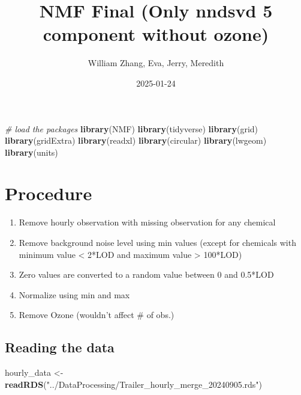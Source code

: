 \documentclass[
]{article}
\title{NMF Final (Only nndsvd 5 component without ozone)}
\author{William Zhang, Eva, Jerry, Meredith}
\date{2025-01-24}
\newenvironment{Shaded}{\begin{snugshade}}{\end{snugshade}}
\newcommand{\CommentTok}[1]{\textcolor[rgb]{0.56,0.35,0.01}{\textit{#1}}}
\newcommand{\FunctionTok}[1]{\textcolor[rgb]{0.13,0.29,0.53}{\textbf{#1}}}
\newcommand{\NormalTok}[1]{#1}
\newcommand{\OtherTok}[1]{\textcolor[rgb]{0.56,0.35,0.01}{#1}}
\newcommand{\StringTok}[1]{\textcolor[rgb]{0.31,0.60,0.02}{#1}}
\providecommand{\tightlist}{%
  \setlength{\itemsep}{0pt}\setlength{\parskip}{0pt}}
\begin{document}
\maketitle

\begin{Shaded}
\begin{Highlighting}[]
\CommentTok{\# load the packages}
\FunctionTok{library}\NormalTok{(NMF)}
\FunctionTok{library}\NormalTok{(tidyverse)}
\FunctionTok{library}\NormalTok{(grid)}
\FunctionTok{library}\NormalTok{(gridExtra)}
\FunctionTok{library}\NormalTok{(readxl)}
\FunctionTok{library}\NormalTok{(circular)}
\FunctionTok{library}\NormalTok{(lwgeom)}
\FunctionTok{library}\NormalTok{(units)}
\end{Highlighting}
\end{Shaded}

\section{Procedure}\label{procedure}

\begin{enumerate}
\def\labelenumi{\arabic{enumi}.}
\tightlist
\item
  Remove hourly observation with missing observation for any chemical
\item
  Remove background noise level using min values (except for chemicals
  with minimum value \textless{} 2*LOD and maximum value \textgreater{}
  100*LOD)
\item
  Zero values are converted to a random value between 0 and 0.5*LOD
\item
  Normalize using min and max
\item
  Remove Ozone (wouldn't affect \# of obs.)
\end{enumerate}

\subsection{Reading the data}\label{reading-the-data}

\begin{Shaded}
\begin{Highlighting}[]
\NormalTok{hourly\_data }\OtherTok{\textless{}{-}} \FunctionTok{readRDS}\NormalTok{(}\StringTok{"../DataProcessing/Trailer\_hourly\_merge\_20240905.rds"}\NormalTok{)}
\end{Highlighting}
\end{Shaded}
\end{document}
